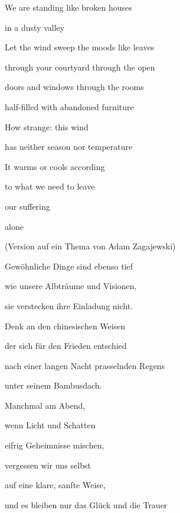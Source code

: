 \documentclass[a4paper]{article}
\begin{document}
\bigskip



\bigskip

We are standing like broken houses

in a dusty valley

Let the wind sweep the moods like leaves

through your courtyard through the open

doors and windows through the rooms

half-filled with abandoned furniture


\bigskip

How strange: this wind

has neither season nor temperature

It warms or cools according

to what we need to leave

our suffering

alone


\bigskip


\bigskip


\bigskip


\bigskip


(Version auf ein Thema von Adam Zagajewski)


\bigskip


\bigskip

Gewöhnliche Dinge sind ebenso tief

wie unsere Albträume und Visionen,

sie verstecken ihre Einladung nicht.


\bigskip

Denk an den chinesischen Weisen

der sich für den Frieden entschied 

{\color{black}
nach einer langen Nacht prasselnden Regens}

unter seinem Bambusdach.


\bigskip

Manchmal am Abend,

wenn Licht und Schatten

eifrig Geheimnisse mischen,


\bigskip

vergessen wir uns selbst

auf eine klare, sanfte Weise,

und es bleiben nur das Glück und die Trauer 
\end{document}
